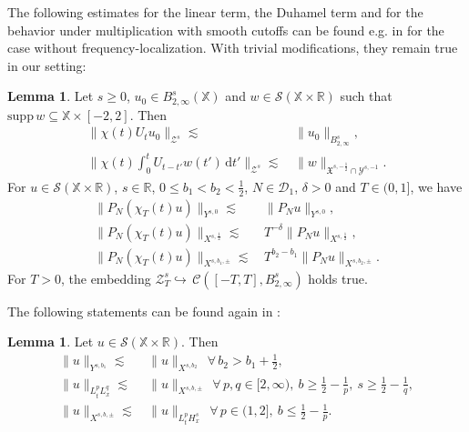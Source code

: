 \documentclass[reqno]{amsart}
\theoremstyle{Definitionl}
\theoremstyle{Definitionk}
\theoremstyle{definition}
\theoremstyle{Satzk}
\newtheorem{lemmak}[defi]{Lemma}
\theoremstyle{Satzl}
\theoremstyle{Bemerkung}
\begin{document}
The following estimates for the linear term, the Duhamel term and for the behavior under multiplication with smooth cutoffs can be found e.g. in \cite{GrnDiss, Herr} for the case without frequency-localization. With trivial modifications, they remain true in our setting:
\begin{lemmak}
Let $s\ge 0$, $u_0\in B^s_{2,\infty}(\mathbb X)$ and $w\in\mathcal S(\mathbb X\times\mathbb R)$ such that $\mathrm{supp}\,w\subseteq\mathbb X\times[-2,2]$. Then
\begin{align*}
\|\chi(t)U_tu_0\|_{\mathcal Z^s}\lesssim&\,\|u_0\|_{B^s_{2,\infty}},\\
\Big\|\chi(t)\int_0^tU_{t-t'}w(t')\,\mathrm dt'\Big\|_{\mathcal Z^s}\lesssim&\,\|w\|_{\mathfrak X^{s,-\frac12}\cap\mathcal Y^{s,-1}}.
\end{align*}
For $u\in\mathcal S(\mathbb X\times\mathbb R)$, $s\in\mathbb R$, $0\le b_1<b_2<\tfrac12$, ${N}\in\mathcal D_1$, $\delta>0$ and $T\in(0,1]$, we have
\begin{align*}
\|P_N(\chi_T(t)u)\|_{Y^{s,0}}\lesssim&\, \|P_Nu\|_{Y^{s,0}},\\
\|P_N(\chi_T(t)u)\|_{X^{s,\frac12}}\lesssim&\, T^{-\delta}\|P_Nu\|_{X^{s,\frac12}},\\
\|P_N(\chi_T(t)u)\|_{X^{s,b_1,\pm}}\lesssim&\, T^{b_2-b_1}\|P_Nu\|_{X^{s,b_2,\pm}}.
\end{align*}
For $T>0$, the embedding $\mathcal Z^s_T\hookrightarrow\, \mathcal C([-T,T],B^s_{2,\infty})$ holds true.
\end{lemmak}
The following statements can be found again in \cite{GrnDiss,Herr}:
\begin{lemmak}
Let $u\in\mathcal S(\mathbb X\times \mathbb R)$. Then
\begin{align}
\|u\|_{Y^{s,b_1}}\lesssim&\, \|u\|_{X^{s,b_2}}\ \ \forall\,b_2>b_1+\frac12,\label{XY}\\
\|u\|_{L^p_tL^q_x}\lesssim&\, \|u\|_{X^{s,b,\pm}}\ \ \forall\,p,q\in[2,\infty),\ b\ge\frac12-\frac1p,\ s\ge\frac12-\frac1q,\label{11}\\
\|u\|_{X^{s,b,\pm}}\lesssim&\, \|u\|_{L^p_tH^s_x}\ \ \forall\,p\in(1,2],\ b\le \frac12-\frac1p.\label{12}
\end{align}
\end{lemmak}
\end{document}
